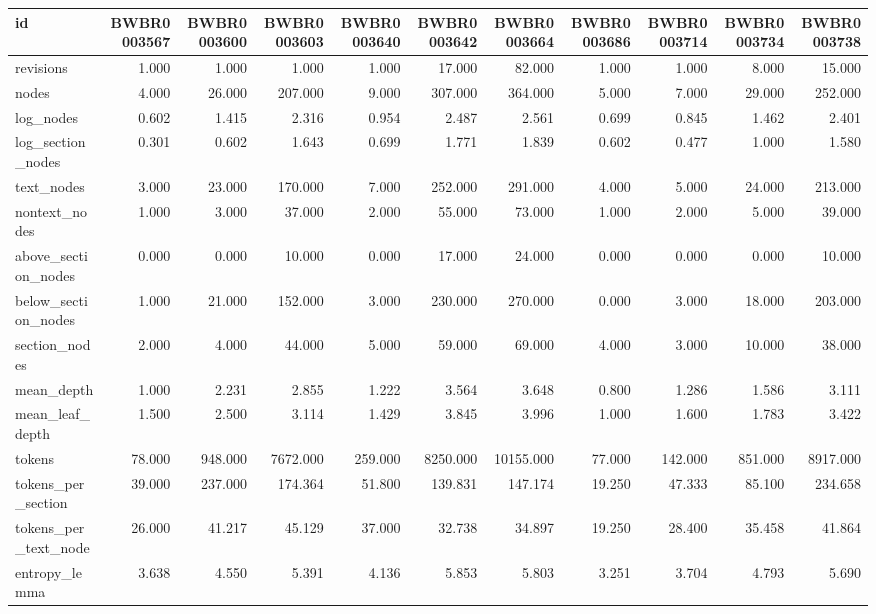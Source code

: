 \begin{tabular}{lrrrrrrrrrr}
\toprule
id & BWBR0003567 & BWBR0003600 & BWBR0003603 & BWBR0003640 & BWBR0003642 & BWBR0003664 & BWBR0003686 & BWBR0003714 & BWBR0003734 & BWBR0003738 \\
\midrule
revisions & 1.000 & 1.000 & 1.000 & 1.000 & 17.000 & 82.000 & 1.000 & 1.000 & 8.000 & 15.000 \\
\cline{1-11}
nodes & 4.000 & 26.000 & 207.000 & 9.000 & 307.000 & 364.000 & 5.000 & 7.000 & 29.000 & 252.000 \\
\cline{1-11}
log\_nodes & 0.602 & 1.415 & 2.316 & 0.954 & 2.487 & 2.561 & 0.699 & 0.845 & 1.462 & 2.401 \\
\cline{1-11}
log\_section\_nodes & 0.301 & 0.602 & 1.643 & 0.699 & 1.771 & 1.839 & 0.602 & 0.477 & 1.000 & 1.580 \\
\cline{1-11}
text\_nodes & 3.000 & 23.000 & 170.000 & 7.000 & 252.000 & 291.000 & 4.000 & 5.000 & 24.000 & 213.000 \\
\cline{1-11}
nontext\_nodes & 1.000 & 3.000 & 37.000 & 2.000 & 55.000 & 73.000 & 1.000 & 2.000 & 5.000 & 39.000 \\
\cline{1-11}
above\_section\_nodes & 0.000 & 0.000 & 10.000 & 0.000 & 17.000 & 24.000 & 0.000 & 0.000 & 0.000 & 10.000 \\
\cline{1-11}
below\_section\_nodes & 1.000 & 21.000 & 152.000 & 3.000 & 230.000 & 270.000 & 0.000 & 3.000 & 18.000 & 203.000 \\
\cline{1-11}
section\_nodes & 2.000 & 4.000 & 44.000 & 5.000 & 59.000 & 69.000 & 4.000 & 3.000 & 10.000 & 38.000 \\
\cline{1-11}
mean\_depth & 1.000 & 2.231 & 2.855 & 1.222 & 3.564 & 3.648 & 0.800 & 1.286 & 1.586 & 3.111 \\
\cline{1-11}
mean\_leaf\_depth & 1.500 & 2.500 & 3.114 & 1.429 & 3.845 & 3.996 & 1.000 & 1.600 & 1.783 & 3.422 \\
\cline{1-11}
tokens & 78.000 & 948.000 & 7672.000 & 259.000 & 8250.000 & 10155.000 & 77.000 & 142.000 & 851.000 & 8917.000 \\
\cline{1-11}
tokens\_per\_section & 39.000 & 237.000 & 174.364 & 51.800 & 139.831 & 147.174 & 19.250 & 47.333 & 85.100 & 234.658 \\
\cline{1-11}
tokens\_per\_text\_node & 26.000 & 41.217 & 45.129 & 37.000 & 32.738 & 34.897 & 19.250 & 28.400 & 35.458 & 41.864 \\
\cline{1-11}
entropy\_lemma & 3.638 & 4.550 & 5.391 & 4.136 & 5.853 & 5.803 & 3.251 & 3.704 & 4.793 & 5.690 \\

\end{tabular}
